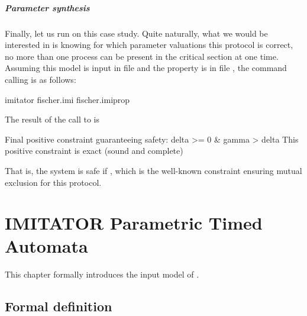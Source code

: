 \paragraph{Parameter synthesis}
Finally, let us run \imitator{} on this case study.
Quite naturally, what we would be interested in is knowing for which parameter valuations this protocol is correct, \ie{} no more than one process can be present in the critical section at one time.
Assuming this model is input in file  and the property is in file , the command calling \imitator{} is as follows:



\begin{terminal}
imitator fischer.imi fischer.imiprop
\end{terminal}

The result of the call to \imitator{} is

\begin{terminaloutput}
Final positive constraint guaranteeing safety:
delta >= 0
& gamma > delta
This positive constraint is exact (sound and complete)
\end{terminaloutput}

That is, the system is safe if , which is the well-known constraint ensuring mutual exclusion for this protocol.




\chapter{IMITATOR Parametric Timed Automata}\label{section:IPTA}


This chapter formally introduces the input model of \imitator{}.

\section{Formal definition}\label{section:NIPTA}

